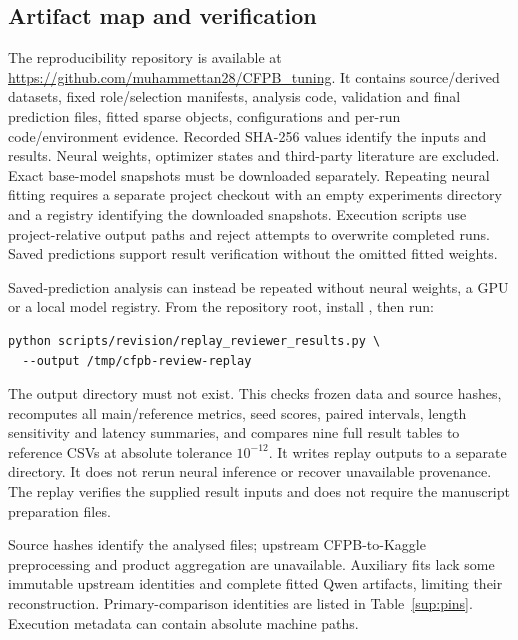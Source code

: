\documentclass[10pt,a4paper]{article}
\begin{document}
\subsection{Artifact map and verification}
The reproducibility repository is available at \url{https://github.com/muhammettan28/CFPB_tuning}. It contains source/derived datasets, fixed role/selection manifests, analysis code, validation and final prediction files, fitted sparse objects, configurations and per-run code/environment evidence. Recorded SHA-256 values identify the inputs and results. Neural weights, optimizer states and third-party literature are excluded. Exact base-model snapshots must be downloaded separately. Repeating neural fitting requires a separate project checkout with an empty experiments directory and a registry identifying the downloaded snapshots. Execution scripts use project-relative output paths and reject attempts to overwrite completed runs. Saved predictions support result verification without the omitted fitted weights.

Saved-prediction analysis can instead be repeated without neural weights, a GPU or a local model registry. From the repository root, install , then run:
\begin{Verbatim}[fontsize=\footnotesize]
python scripts/revision/replay_reviewer_results.py \
  --output /tmp/cfpb-review-replay
\end{Verbatim}
The output directory must not exist. This checks frozen data and source hashes, recomputes all main/reference metrics, seed scores, paired intervals, length sensitivity and latency summaries, and compares nine full result tables to reference CSVs at absolute tolerance $10^{-12}$. It writes replay outputs to a separate directory. It does not rerun neural inference or recover unavailable provenance. The replay verifies the supplied result inputs and does not require the manuscript preparation files.

Source hashes identify the analysed files; upstream CFPB-to-Kaggle preprocessing and product aggregation are unavailable. Auxiliary fits lack some immutable upstream identities and complete fitted Qwen artifacts, limiting their reconstruction. Primary-comparison identities are listed in Table~\ref{sup:pins}. Execution metadata can contain absolute machine paths.
\end{document}
